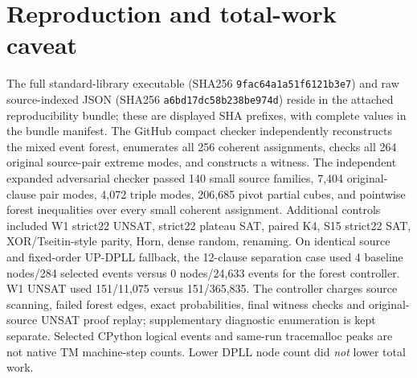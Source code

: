 \documentclass[10pt]{article}
\begin{document}
\section{Reproduction and total-work caveat}
The full standard-library executable (SHA256 \texttt{9fac64a1a51f6121b3e7}) and raw source-indexed JSON (SHA256 \texttt{a6bd17dc58b238be974d}) reside in the attached reproducibility bundle; these are displayed SHA prefixes, with complete values in the bundle manifest. The GitHub compact checker independently reconstructs the mixed event forest, enumerates all 256 coherent assignments, checks all 264 original source-pair extreme modes, and constructs a witness. The independent expanded adversarial checker passed 140 small source families, 7,404 original-clause pair modes, 4,072 triple modes, 206,685 pivot partial cubes, and pointwise forest inequalities over every small coherent assignment. Additional controls included W1 strict22 UNSAT, strict22 plateau SAT, paired K4, S15 strict22 SAT, XOR/Tseitin-style parity, Horn, dense random, renaming.
On identical source and fixed-order UP-DPLL fallback, the 12-clause separation case used 4 baseline nodes/284 selected events versus 0 nodes/24,633 events for the forest controller. W1 UNSAT used 151/11,075 versus 151/365,835. The controller charges source scanning, failed forest edges, exact probabilities, final witness checks and original-source UNSAT proof replay; supplementary diagnostic enumeration is kept separate. Selected CPython logical events and same-run tracemalloc peaks are not native TM machine-step counts. Lower DPLL node count did \emph{not} lower total work.
\end{document}
